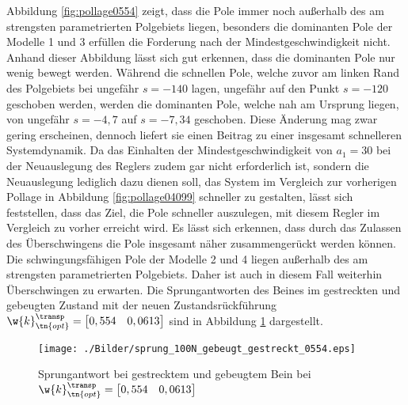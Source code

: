 Abbildung \ref{fig:pollage0554} zeigt, dass die Pole immer noch außerhalb des am strengsten parametrierten Polgebiets liegen, besonders die dominanten Pole der Modelle 1 und 3 erfüllen die Forderung nach der Mindestgeschwindigkeit nicht. Anhand dieser Abbildung lässt sich gut erkennen, dass die dominanten Pole nur wenig bewegt werden. Während die schnellen Pole, welche zuvor am linken Rand des Polgebiets bei ungefähr $s = -140$ lagen, ungefähr auf den Punkt $s = -120$ geschoben werden, werden die dominanten Pole, welche nah am Ursprung liegen, von ungefähr $s=-4,7$ auf $s=-7,34$ geschoben. Diese Änderung mag zwar gering erscheinen, dennoch liefert sie einen Beitrag zu einer insgesamt schnelleren Systemdynamik. Da das Einhalten der Mindestgeschwindigkeit von $a_1 = 30$ bei der Neuauslegung des Reglers zudem gar nicht erforderlich ist, sondern die Neuauslegung lediglich dazu dienen soll, das System im Vergleich zur vorherigen Pollage in Abbildung \ref{fig:pollage04099} schneller zu gestalten, lässt sich feststellen, dass das Ziel, die Pole schneller auszulegen, mit diesem Regler im Vergleich zu vorher erreicht wird. Es lässt sich erkennen, dass durch das Zulassen des Überschwingens die Pole insgesamt näher zusammengerückt werden können. Die schwingungsfähigen Pole der Modelle 2 und 4 liegen außerhalb des am strengsten parametrierten Polgebiets. Daher ist auch in diesem Fall weiterhin Überschwingen zu erwarten. Die Sprungantworten des Beines im gestreckten und gebeugten Zustand mit der neuen Zustandsrückführung $\w{k}_\tn{opt}^\transp = \begin{bmatrix}	0,554 & 0,0613 \\ \end{bmatrix} $ sind in Abbildung \ref{fig:sprungantwort_bein_neu} dargestellt.
\begin{figure}[h]
	\centering
	\texttt{[image: ./Bilder/sprung\_100N\_gebeugt\_gestreckt\_0554.eps]}
	\caption[sprungantwort_bein]{Sprungantwort bei gestrecktem und gebeugtem Bein bei $\w{k}_\tn{opt}^\transp = \begin{bmatrix} 0,554 & 0,0613\end{bmatrix}$}
	\label{fig:sprungantwort_bein_neu}
\end{figure}
